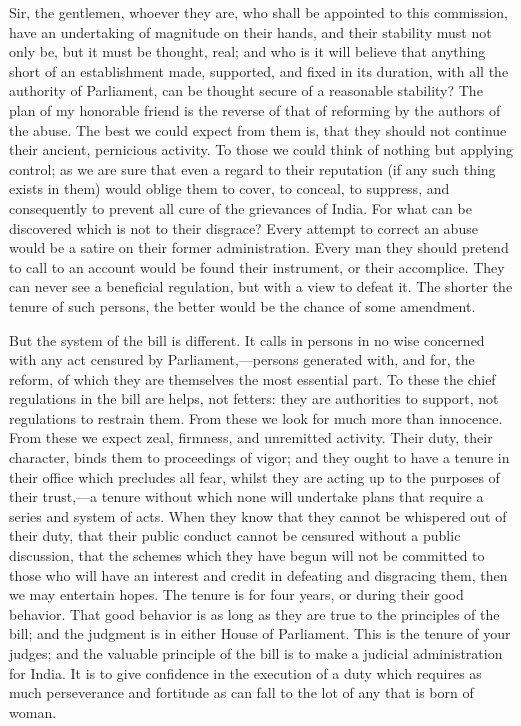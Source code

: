 Sir, the gentlemen, whoever they are, who shall be appointed to this commission, have an undertaking of magnitude on their hands, and their stability must not only be, but it must be thought, real; and who is it will believe that anything short of an establishment made, supported, and fixed in its duration, with all the authority of Parliament, can be thought secure of a reasonable stability? The plan of my honorable friend is the reverse of that of reforming by the authors of the abuse. The best we could expect from them is, that they should not continue their ancient, pernicious activity. To those we could think of nothing but applying control; as we are sure that even a regard to their reputation (if any such thing exists in them) would oblige them to cover, to conceal, to suppress, and consequently to prevent all cure of the grievances of India. For what can be discovered which is not to their disgrace? Every attempt to correct an abuse would be a satire on their former administration. Every man they should pretend to call to an account would be found their instrument, or their accomplice. They can never see a beneficial regulation, but with a view to defeat it. The shorter the tenure of such persons, the better would be the chance of some amendment.

But the system of the bill is different. It calls in persons in no wise concerned with any act censured by Parliament,—persons generated with, and for, the reform, of which they are themselves the most essential part. To these the chief regulations in the bill are helps, not fetters: they are authorities to support, not regulations to restrain them. From these we look for much more than innocence. From these we expect zeal, firmness, and unremitted activity. Their duty, their character, binds them to proceedings of vigor; and they ought to have a tenure in their office which precludes all fear, whilst they are acting up to the purposes of their trust,—a tenure without which none will undertake plans that require a series and system of acts. When they know that they cannot be whispered out of their duty, that their public conduct cannot be censured without a public discussion, that the schemes which they have begun will not be committed to those who will have an interest and credit in defeating and disgracing them, then we may entertain hopes. The tenure is for four years, or during their good behavior. That good behavior is as long as they are true to the principles of the bill; and the judgment is in either House of Parliament. This is the tenure of your judges; and the valuable principle of the bill is to make a judicial administration for India. It is to give confidence in the execution of a duty which requires as much perseverance and fortitude as can fall to the lot of any that is born of woman.

